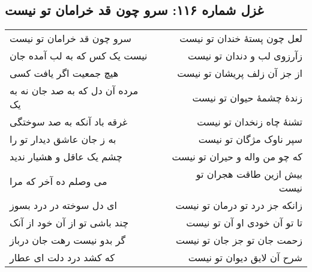 \begin{center}
\section*{غزل شماره ۱۱۶: سرو چون قد خرامان تو نیست}
\label{sec:116}
\begin{longtable}{l p{0.5cm} r}
سرو چون قد خرامان تو نیست
&&
لعل چون پستهٔ خندان تو نیست
\\
نیست یک کس که به لب آمده جان
&&
زآرزوی لب و دندان تو نیست
\\
هیچ جمعیت اگر یافت کسی
&&
از جز آن زلف پریشان تو نیست
\\
مرده آن دل که به صد جان نه به یک
&&
زندهٔ چشمهٔ حیوان تو نیست
\\
غرقه باد آنکه به صد سوختگی
&&
تشنهٔ چاه زنخدان تو نیست
\\
به ز جان عاشق دیدار تو را
&&
سپر ناوک مژگان تو نیست
\\
چشم یک عاقل و هشیار ندید
&&
که چو من واله و حیران تو نیست
\\
می وصلم ده آخر که مرا
&&
بیش ازین طاقت هجران تو نیست
\\
ای دل سوخته در درد بسوز
&&
زانکه جز درد تو درمان تو نیست
\\
چند باشی تو از آن خود از آنک
&&
تا تو آن خودی او آن تو نیست
\\
گر بدو نیست رهت جان درباز
&&
زحمت جان تو جز جان تو نیست
\\
که کشد درد دلت ای عطار
&&
شرح آن لایق دیوان تو نیست
\\
\end{longtable}
\end{center}
